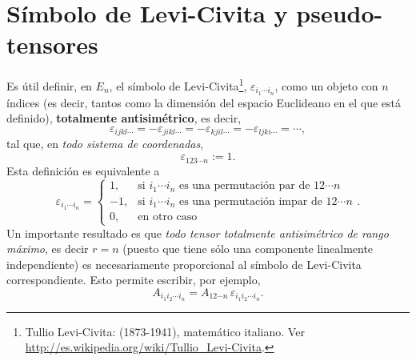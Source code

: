 \section{Símbolo de Levi-Civita y pseudo-tensores}
Es útil definir, en $E_n$, el símbolo de Levi-Civita\footnote{Tullio Levi-Civita:  (1873-1941), matemático italiano. Ver \url{http://es.wikipedia.org/wiki/Tullio_Levi-Civita}.}, $\varepsilon_{i_1\cdots i_n}$, como un objeto con $n$ índices (es decir, tantos como la dimensión del espacio Euclideano en el que está definido), \textbf{totalmente antisimétrico}, es decir,
\begin{equation}
\varepsilon_{ijkl\cdots}=-\varepsilon_{jikl\cdots}=-\varepsilon_{kjil\cdots} =-\varepsilon_{ljki\cdots}= \cdots,
\end{equation}
tal que, en \textit{todo sistema de coordenadas},
\begin{equation}
\varepsilon_{123\cdots n}:=1.
\end{equation}
Esta definición es equivalente a
\begin{equation}
\varepsilon_{i_1\cdots i_n}
=\left\lbrace\begin{array}{rl}
1, & \text{si $i_1\cdots i_n$ es una permutación par de $12\cdots n$} \\ 
-1, & \text{si $i_1\cdots i_n$ es una permutación impar de $12\cdots n$} \\ 
0, & \text{en otro caso} 
\end{array} \right. .
\end{equation}
Un importante resultado es que \textit{todo tensor totalmente antisimétrico de rango máximo}, es decir $r=n$ (puesto que tiene sólo una componente linealmente independiente) es necesariamente proporcional al símbolo de Levi-Civita correspondiente. Esto permite escribir, por ejemplo,
\begin{equation}\label{Aep}
A_{i_1i_2\cdots i_n}=A_{12\cdots n}\,\varepsilon_{i_1i_2\cdots i_n}.
\end{equation}

